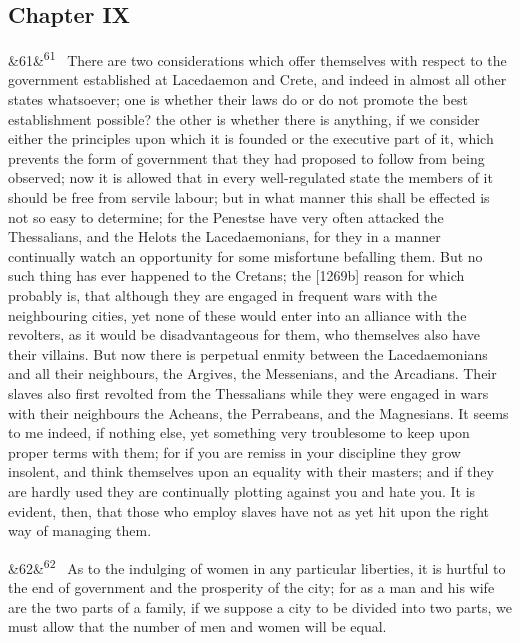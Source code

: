 \documentclass[12pt]{article}
\newcommand{\para}[1][]{\par\noindent\ifx&#1&\else\textsuperscript{\footnotesize #1}~\fi}
\begin{document}
\subsection*{Chapter IX}

\para[61] There are two considerations which offer themselves with respect to the government established at Lacedaemon and Crete, and indeed in almost all other states whatsoever; one is whether their laws do or do not promote the best establishment possible? the other is whether there is anything, if we consider either the principles upon which it is founded or the executive part of it, which prevents the form of government that they had proposed to follow from being observed; now it is allowed that in every well-regulated state the members of it should be free from servile labour; but in what manner this shall be effected is not so easy to determine; for the Penestse have very often attacked the Thessalians, and the Helots the Lacedaemonians, for they in a manner continually watch an opportunity for some misfortune befalling them. But no such thing has ever happened to the Cretans; the [1269b] reason for which probably is, that although they are engaged in frequent wars with the neighbouring cities, yet none of these would enter into an alliance with the revolters, as it would be disadvantageous for them, who themselves also have their villains. But now there is perpetual enmity between the Lacedaemonians and all their neighbours, the Argives, the Messenians, and the Arcadians. Their slaves also first revolted from the Thessalians while they were engaged in wars with their neighbours the Acheans, the Perrabeans, and the Magnesians. It seems to me indeed, if nothing else, yet something very troublesome to keep upon proper terms with them; for if you are remiss in your discipline they grow insolent, and think themselves upon an equality with their masters; and if they are hardly used they are continually plotting against you and hate you. It is evident, then, that those who employ slaves have not as yet hit upon the right way of managing them.

\para[62] As to the indulging of women in any particular liberties, it is hurtful to the end of government and the prosperity of the city; for as a man and his wife are the two parts of a family, if we suppose a city to be divided into two parts, we must allow that the number of men and women will be equal.
\end{document}
